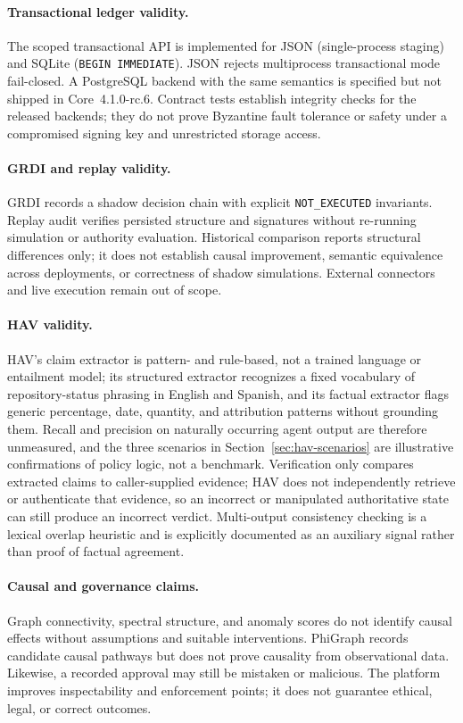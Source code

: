 \documentclass[11pt]{article}
\begin{document}
\paragraph{Transactional ledger validity.}
The scoped transactional API is implemented for JSON (single-process staging)
and SQLite (\texttt{BEGIN IMMEDIATE}). JSON rejects multiprocess transactional
mode fail-closed. A PostgreSQL backend with the same semantics is specified
but not shipped in Core~4.1.0-rc.6. Contract tests establish integrity checks
for the released backends; they do not prove Byzantine fault tolerance or
safety under a compromised signing key and unrestricted storage access.

\paragraph{GRDI and replay validity.}
GRDI records a shadow decision chain with explicit \texttt{NOT\_EXECUTED}
invariants. Replay audit verifies persisted structure and signatures without
re-running simulation or authority evaluation. Historical comparison reports
structural differences only; it does not establish causal improvement,
semantic equivalence across deployments, or correctness of shadow simulations.
External connectors and live execution remain out of scope.

\paragraph{HAV validity.}
HAV's claim extractor is pattern- and rule-based, not a trained language or
entailment model; its structured extractor recognizes a fixed vocabulary of
repository-status phrasing in English and Spanish, and its factual extractor
flags generic percentage, date, quantity, and attribution patterns without
grounding them. Recall and precision on naturally occurring agent output are
therefore unmeasured, and the three scenarios in Section~\ref{sec:hav-scenarios}
are illustrative confirmations of policy logic, not a benchmark. Verification only compares
extracted claims to caller-supplied evidence; HAV does not independently
retrieve or authenticate that evidence, so an incorrect or manipulated
authoritative state can still produce an incorrect verdict. Multi-output
consistency checking is a lexical overlap heuristic and is explicitly
documented as an auxiliary signal rather than proof of factual agreement.

\paragraph{Causal and governance claims.}
Graph connectivity, spectral structure, and anomaly scores do not identify
causal effects without assumptions and suitable interventions. PhiGraph records
candidate causal pathways but does not prove causality from observational data.
Likewise, a recorded approval may still be mistaken or malicious. The platform
improves inspectability and enforcement points; it does not guarantee ethical,
legal, or correct outcomes.
\end{document}
